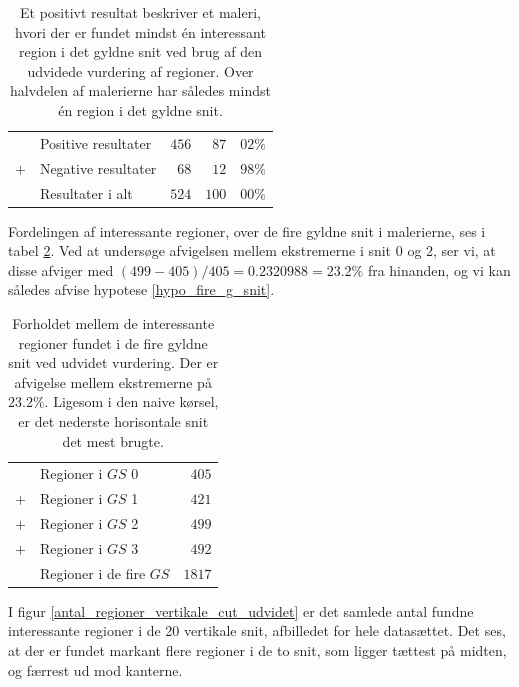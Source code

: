 {\begin{table}[H]
    \centering
    \begin{tabular}{r@{\ \ }p{12em}r|r@{.}l}
            & Positive resultater   & $456$ &  $87$ & $02\%$ \\
        $+$ & Negative resultater   &  $68$ &  $12$ & $98\%$ \\\hline
            & Resultater i alt      & $524$ & $100$ & $00\%$
    \end{tabular}
    \caption[]{Et positivt resultat beskriver et maleri, hvori der er
    fundet mindst én interessant region i det gyldne snit ved brug af
    den udvidede vurdering af regioner. Over halvdelen af malerierne har
    således mindst én region i det gyldne snit.}
    \label{ud_tabel_fordeling}
\end{table}

Fordelingen af interessante regioner, over de fire gyldne snit i
malerierne, ses i tabel \ref{ud_tabel_fire_snit}. Ved at undersøge
afvigelsen mellem ekstremerne i snit 0 og 2, ser vi, at disse afviger med
$(499 - 405)/405 = 0.2320988 = 23.2 \%$ fra hinanden, og vi kan således
afvise hypotese \ref{hypo_fire_g_snit}.

\begin{table}[H]
    \centering
    \begin{tabular}{r@{\ \ }p{12em}r}
            & Regioner i $GS$ 0         &  $405$ \\
        $+$ & Regioner i $GS$ 1         &  $421$ \\
        $+$ & Regioner i $GS$ 2         &  $499$ \\
        $+$ & Regioner i $GS$ 3         &  $492$ \\\hline
            & Regioner i de fire $GS$   & $1817$
    \end{tabular}
    \caption[]{Forholdet mellem de interessante regioner fundet i de
    fire gyldne snit ved udvidet vurdering. Der er afvigelse mellem
    ekstremerne på $23.2 \%$. Ligesom i den naive kørsel, er det
    nederste horisontale snit det mest brugte.}
    \label{ud_tabel_fire_snit}
\end{table}

I figur \ref{antal_regioner_vertikale_cut_udvidet} er det samlede antal
fundne interessante regioner i de 20 vertikale snit, afbilledet for hele
datasættet.  Det ses, at der er fundet markant flere regioner i de to
snit, som ligger tættest på midten, og færrest ud mod kanterne.

}
